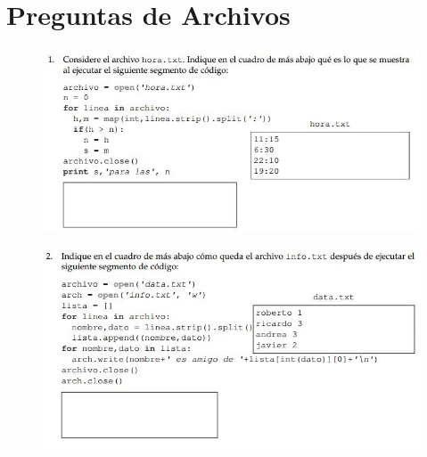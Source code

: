 \section{Preguntas de Archivos}
\begin{figure}[h]
    \centering
    \includegraphics{Imagenes/imagen01.jpg}
\end{figure}
\begin{figure}[h]
    \centering
    \includegraphics{Imagenes/imagen02.jpg}
\end{figure}